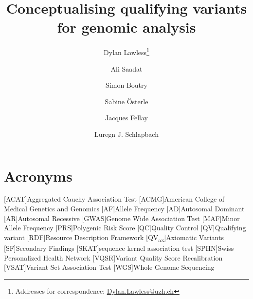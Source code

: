 
\usepackage[printonlyused,withpage,nohyperlinks]{acronym}
% 


\newcommand{\boxlabel}[1]{%
  \refstepcounter{myboxcounter}%
  \label{#1}%
}


\title{Conceptualising qualifying variants for genomic analysis}

\author[1]{Dylan Lawless\thanks{Addresses for correspondence: \href{mailto:Dylan.Lawless@uzh.ch}{Dylan.Lawless@uzh.ch}}}
\author[2]{Ali Saadat}
\author[2]{Simon Boutry}
\author[3]{Sabine Österle}
\author[2]{\rm Jacques Fellay}
\author[1]{Luregn J. Schlapbach}

\maketitle
\justify

\section*{Acronyms}
\renewenvironment{description} %
{\list{}{\labelwidth0pt\itemindent-\leftmargin
    \parsep-1em\itemsep0pt\let\makelabel\descriptionlabel}}
               {\endlist}
\begin{acronym} 
 [ACAT]{Aggregated Cauchy Association Test }
 [ACMG]{American College of Medical Genetics and Genomics}
 [AF]{Allele Frequency}
 [AD]{Autosomal Dominant}
 [AR]{Autosomal Recessive}
 [GWAS]{Genome Wide Association Test}
 [MAF]{Minor Allele Frequency}
 [PRS]{Polygenic Risk Score} 
 [QC]{Quality Control}
 [QV]{Qualifying variant}
 [RDF]{Resource Description Framework}
 [QV\textsubscript{ax}]{Axiomatic Variants}
 [SF]{Secondary Findings}
 [SKAT]{sequence kernel association test} 
 [SPHN]{Swiss Personalized Health Network}
 [VQSR]{Variant Quality Score Recalibration}
 [VSAT]{Variant Set Association Test}
 [WGS]{Whole Genome Sequencing}
\end{acronym}
  
